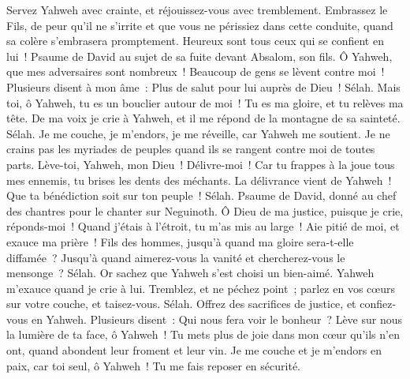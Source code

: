 \begin{multicols}{2}
Servez Yahweh avec crainte, et réjouissez-vous avec tremblement.
Embrassez le Fils, de peur qu'il ne s'irrite et que vous ne périssiez dans cette conduite, quand sa colère s'embrasera promptement. Heureux sont tous ceux qui se confient en lui~!
\VerseOne{}Psaume de David au sujet de sa fuite devant Absalom, son fils.
Ô Yahweh, que mes adversaires sont nombreux~! Beaucoup de gens se lèvent contre moi~!
Plusieurs disent à mon âme~: Plus de salut pour lui auprès de Dieu~! Sélah.
Mais toi, ô Yahweh, tu es un bouclier autour de moi~! Tu es ma gloire, et tu relèves ma tête.
De ma voix je crie à Yahweh, et il me répond de la montagne de sa sainteté. Sélah.
Je me couche, je m'endors, je me réveille, car Yahweh me soutient.
Je ne crains pas les myriades de peuples quand ils se rangent contre moi de toutes parts.
Lève-toi, Yahweh, mon Dieu~! Délivre-moi~! Car tu frappes à la joue tous mes ennemis, tu brises les dents des méchants.
La délivrance vient de Yahweh~! Que ta bénédiction soit sur ton peuple~! Sélah.
\VerseOne{}Psaume de David, donné au chef des chantres pour le chanter sur Neguinoth.
Ô Dieu de ma justice, puisque je crie, réponds-moi~! Quand j'étais à l'étroit, tu m'as mis au large~! Aie pitié de moi, et exauce ma prière~!
Fils des hommes, jusqu'à quand ma gloire sera-t-elle diffamée~? Jusqu'à quand aimerez-vous la vanité et chercherez-vous le mensonge~? Sélah.
Or sachez que Yahweh s'est choisi un bien-aimé. Yahweh m'exauce quand je crie à lui.
Tremblez, et ne péchez point~; parlez en vos cœurs sur votre couche, et taisez-vous. Sélah.
Offrez des sacrifices de justice, et confiez-vous en Yahweh.
Plusieurs disent~: Qui nous fera voir le bonheur~? Lève sur nous la lumière de ta face, ô Yahweh~!
Tu mets plus de joie dans mon cœur qu'ils n'en ont, quand abondent leur froment et leur vin.
Je me couche et je m'endors en paix, car toi seul, ô Yahweh~! Tu me fais reposer en sécurité.

\end{multicols}
